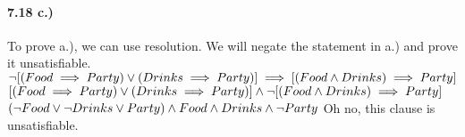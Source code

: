 \documentclass[12pt]{article}
\begin{document}
\paragraph{7.18 c.)} To prove a.), we can use resolution. We will negate the statement in a.) and prove it unsatisfiable.\\
$\neg [(Food \implies Party) \lor (Drinks \implies Party)]\\
\implies [(Food \land Drinks) \implies Party]$\\
$[(Food \implies Party) \lor (Drinks \implies Party)]\\ 
\land \neg [(Food \land Drinks) \implies Party]$\\
$(\neg Food \lor \neg Drinks \lor Party) \land Food \land Drinks \land \neg Party\\$
Oh no, this clause is unsatisfiable.
\end{document}
